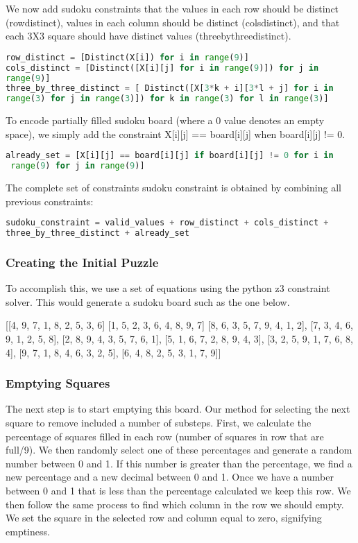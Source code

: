 We now add sudoku constraints that the values in each row should be
distinct (rowdistinct), values in each column should be distinct
(colsdistinct), and that each 3X3 square should have distinct values
(threebythreedistinct).

\begin{lstlisting}[language=python]
row_distinct = [Distinct(X[i]) for i in range(9)]
cols_distinct = [Distinct([X[i][j] for i in range(9)]) for j in
range(9)] 
three_by_three_distinct = [ Distinct([X[3*k + i][3*l + j] for i in
range(3) for j in range(3)]) for k in range(3) for l in range(3)]

\end{lstlisting}

To encode partially filled sudoku board (where a 0 value denotes an
empty space), we simply add the constraint X[i][j] == board[i][j] when
board[i][j] != 0. 

\begin{lstlisting}[language=python]
 already_set = [X[i][j] == board[i][j] if board[i][j] != 0 for i in
 range(9) for j in range(9)]

\end{lstlisting}

The complete set of constraints sudoku constraint is obtained by
combining all previous constraints:

\begin{lstlisting}[language=python]
sudoku_constraint = valid_values + row_distinct + cols_distinct +
three_by_three_distinct + already_set
\end{lstlisting}


\subsubsection{Creating the Initial Puzzle}
To accomplish this, we use a set of equations using the python z3
constraint solver. This would generate a sudoku board such as the one
below. 

[[4, 9, 7, 1, 8, 2, 5, 3, 6]
[1, 5, 2, 3, 6, 4, 8, 9, 7] 
[8, 6, 3, 5, 7, 9, 4, 1, 2],
[7, 3, 4, 6, 9, 1, 2, 5, 8],
[2, 8, 9, 4, 3, 5, 7, 6, 1],
[5, 1, 6, 7, 2, 8, 9, 4, 3],
[3, 2, 5, 9, 1, 7, 6, 8, 4],
[9, 7, 1, 8, 4, 6, 3, 2, 5],
[6, 4, 8, 2, 5, 3, 1, 7, 9]]

\subsubsection{Emptying Squares}
The next step is to start emptying this board. Our method for
selecting the next square to remove included a number of
substeps. First, we calculate the percentage of squares filled in each
row (number of squares in row that are full/9). We then randomly
select one of these percentages and generate a random number between 0
and 1. If this number is greater than the percentage, we find a new
percentage and a new decimal between 0 and 1. Once we have a number
between 0 and 1 that is less than the percentage calculated we keep
this row. We then follow the same process to find which column in the
row we should empty. We set the square in the selected row and column
equal to zero, signifying emptiness.


